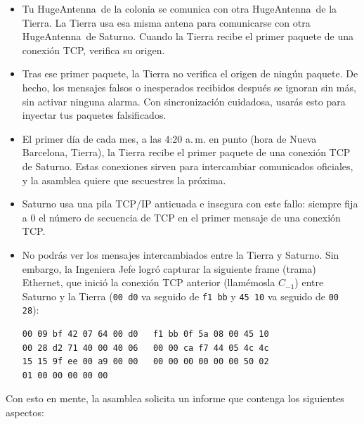 \begin{itemize}[itemsep=0.1cm]
\item Tu HugeAntenna\texttrademark\ de la colonia se comunica con otra HugeAntenna\texttrademark\ de la Tierra. La Tierra usa esa misma antena para comunicarse con otra HugeAntenna\texttrademark\ de Saturno.
Cuando la Tierra recibe el primer paquete de una conexión TCP, verifica su origen.

\item Tras ese primer paquete, la Tierra no verifica el origen de ningún paquete. De hecho, los mensajes falsos o inesperados recibidos después se ignoran sin más, sin activar ninguna alarma. Con sincronización cuidadosa, usarás esto para inyectar tus paquetes falsificados.

\item El primer día de cada mes, a las 4:20 a.\,m. en punto (hora de Nueva Barcelona, Tierra), la Tierra recibe el primer paquete de una conexión TCP de Saturno. Estas conexiones sirven para intercambiar comunicados oficiales, y la asamblea quiere que secuestres la próxima.

\item Saturno usa una pila TCP/IP anticuada e insegura con este fallo: siempre fija a $0$ el número de secuencia de TCP en el primer mensaje de una conexión TCP.

\item No podrás ver los mensajes intercambiados entre la Tierra y Saturno. Sin embargo, la Ingeniera Jefe logró capturar la siguiente frame (trama) Ethernet, que inició la conexión TCP anterior (llamémosla $C_{-1}$) entre Saturno y la Tierra (\texttt{00 d0} va seguido de \texttt{f1 bb} y \texttt{45 10} va seguido de \texttt{00 28}):

\vspace{0.25cm}
\begin{center}
\begin{minipage}{0.5\linewidth}
\begin{verbatim}
00 09 bf 42 07 64 00 d0   f1 bb 0f 5a 08 00 45 10
00 28 d2 71 40 00 40 06   00 00 ca f7 44 05 4c 4c
15 15 9f ee 00 a9 00 00   00 00 00 00 00 00 50 02
01 00 00 00 00 00
\end{verbatim}
\end{minipage}
\end{center}
\vspace{0.25cm}
\end{itemize}

\noindent
Con esto en mente, la asamblea solicita un informe que contenga los siguientes aspectos:

